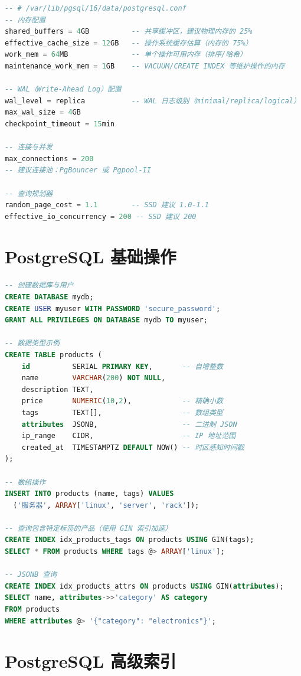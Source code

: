 \documentclass[12pt,UTF8]{ctexbook}
\begin{document}
\begin{lstlisting}[language=sql]
-- # /var/lib/pgsql/16/data/postgresql.conf
-- 内存配置
shared_buffers = 4GB          -- 共享缓冲区，建议物理内存的 25%
effective_cache_size = 12GB   -- 操作系统缓存估算（内存的 75%）
work_mem = 64MB               -- 单个操作可用内存（排序/哈希）
maintenance_work_mem = 1GB    -- VACUUM/CREATE INDEX 等维护操作的内存

-- WAL（Write-Ahead Log）配置
wal_level = replica           -- WAL 日志级别（minimal/replica/logical）
max_wal_size = 4GB
checkpoint_timeout = 15min

-- 连接与并发
max_connections = 200
-- 建议连接池：PgBouncer 或 Pgpool-II

-- 查询规划器
random_page_cost = 1.1        -- SSD 建议 1.0-1.1
effective_io_concurrency = 200 -- SSD 建议 200
\end{lstlisting}

\section{PostgreSQL 基础操作}
\label{sec:postgresql-basics}

\begin{lstlisting}[language=sql]
-- 创建数据库与用户
CREATE DATABASE mydb;
CREATE USER myuser WITH PASSWORD 'secure_password';
GRANT ALL PRIVILEGES ON DATABASE mydb TO myuser;

-- 数据类型示例
CREATE TABLE products (
    id          SERIAL PRIMARY KEY,       -- 自增整数
    name        VARCHAR(200) NOT NULL,
    description TEXT,
    price       NUMERIC(10,2),            -- 精确小数
    tags        TEXT[],                   -- 数组类型
    attributes  JSONB,                    -- 二进制 JSON
    ip_range    CIDR,                     -- IP 地址范围
    created_at  TIMESTAMPTZ DEFAULT NOW() -- 时区感知时间戳
);

-- 数组操作
INSERT INTO products (name, tags) VALUES
  ('服务器', ARRAY['linux', 'server', 'rack']);

-- 查询包含特定标签的产品（使用 GIN 索引加速）
CREATE INDEX idx_products_tags ON products USING GIN(tags);
SELECT * FROM products WHERE tags @> ARRAY['linux'];

-- JSONB 查询
CREATE INDEX idx_products_attrs ON products USING GIN(attributes);
SELECT name, attributes->>'category' AS category
FROM products
WHERE attributes @> '{"category": "electronics"}';
\end{lstlisting}

\section{PostgreSQL 高级索引}
\label{sec:postgresql-index}
\end{document}
